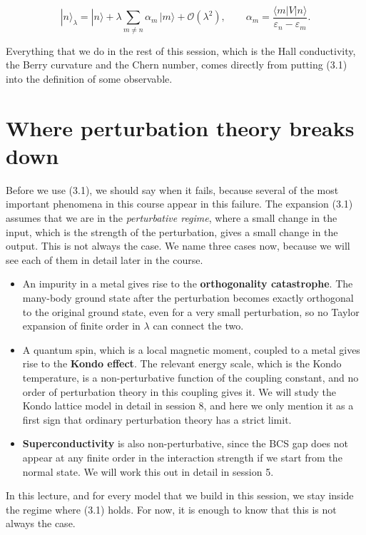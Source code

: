 \begin{equation}
|n\rangle_\lambda = |n\rangle + \lambda \sum_{m \neq n} \alpha_m\, |m\rangle + \mathcal{O}(\lambda^2),
\qquad \alpha_m = \frac{\langle m|V|n\rangle}{\varepsilon_n - \varepsilon_m}.
\end{equation}

Everything that we do in the rest of this session, which is the Hall conductivity, the Berry
curvature and the Chern number, comes directly from putting (3.1) into the definition of some
observable.

\section{Where perturbation theory breaks down}

Before we use (3.1), we should say when it fails, because several of the most important phenomena in
this course appear in this failure. The expansion (3.1) assumes that we are in the \emph{perturbative
regime}, where a small change in the input, which is the strength of the perturbation, gives a small
change in the output. This is not always the case. We name three cases now, because we will see each
of them in detail later in the course.

\begin{itemize}
\item An impurity in a metal gives rise to the \textbf{orthogonality catastrophe}. The many-body
  ground state after the perturbation becomes exactly orthogonal to the original ground state, even
  for a very small perturbation, so no Taylor expansion of finite order in $\lambda$ can connect the
  two.
\item A quantum spin, which is a local magnetic moment, coupled to a metal gives rise to the
  \textbf{Kondo effect}. The relevant energy scale, which is the Kondo temperature, is a
  non-perturbative function of the coupling constant, and no order of perturbation theory in this
  coupling gives it. We will study the Kondo lattice model in detail in session 8, and here we only
  mention it as a first sign that ordinary perturbation theory has a strict limit.
\item \textbf{Superconductivity} is also non-perturbative, since the BCS gap does not appear at any
  finite order in the interaction strength if we start from the normal state. We will work this out
  in detail in session 5.
\end{itemize}

In this lecture, and for every model that we build in this session, we stay inside the regime where
(3.1) holds. For now, it is enough to know that this is not always the case.

